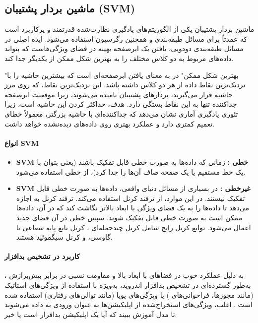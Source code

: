 \subsection{ماشین بردار پشتیبان (SVM)}
ماشین بردار پشتیبان  یکی از الگوریتم‌های یادگیری نظارت‌شده قدرتمند و پرکاربرد است که عمدتاً برای مسائل طبقه‌بندی  و همچنین رگرسیون  استفاده می‌شود. ایده اصلی  در مسائل طبقه‌بندی دودویی، یافتن یک ابرصفحه  بهینه در فضای ویژگی‌هاست که بتواند داده‌های مربوط به دو کلاس مختلف را به بهترین شکل ممکن از یکدیگر جدا کند.

"بهترین شکل ممکن" در  به معنای یافتن ابرصفحه‌ای است که بیشترین حاشیه  را با نزدیک‌ترین نقاط داده از هر دو کلاس داشته باشد. این نزدیک‌ترین نقاط، که روی مرز حاشیه قرار می‌گیرند، بردارهای پشتیبان  نامیده می‌شوند، زیرا موقعیت ابرصفحه جداکننده تنها به این نقاط بستگی دارد. هدف، حداکثر کردن این حاشیه است، زیرا تئوری یادگیری آماری نشان می‌دهد که جداکننده‌ای با حاشیه بزرگتر، معمولاً خطای تعمیم کمتری دارد و عملکرد بهتری روی داده‌های دیده‌نشده خواهد داشت.

\paragraph{انواع SVM}
\begin{itemize}
    \item \textbf{SVM خطی :} زمانی که داده‌ها به صورت خطی قابل تفکیک باشند (یعنی بتوان با یک خط مستقیم یا یک صفحه صاف آن‌ها را جدا کرد)، از  خطی استفاده می‌شود.
    \item \textbf{SVM غیرخطی :} در بسیاری از مسائل دنیای واقعی، داده‌ها به صورت خطی قابل تفکیک نیستند. در این موارد،  از ترفند کرنل  استفاده می‌کند. ترفند کرنل به  اجازه می‌دهد تا داده‌ها را به یک فضای ویژگی با ابعاد بالاتر نگاشت کند که در آن، داده‌ها ممکن است به صورت خطی قابل تفکیک شوند. سپس  خطی در آن فضای جدید اعمال می‌شود. توابع کرنل رایج شامل کرنل چندجمله‌ای ، کرنل تابع پایه شعاعی  یا گاوسی، و کرنل سیگموئید  هستند.
\end{itemize}

\paragraph{کاربرد در تشخیص بدافزار}
 به دلیل عملکرد خوب در فضاهای با ابعاد بالا و مقاومت نسبی در برابر بیش‌برازش ، به‌طور گسترده‌ای در تشخیص بدافزار اندروید، به‌ویژه با استفاده از ویژگی‌های استاتیک (مانند مجوزها، فراخوانی‌های ) یا ویژگی‌های پویا (مانند توالی‌های رفتاری) استفاده شده است \cite{AndroidMalwareSurvey, Demontis2017}. اغلب، ویژگی‌های استخراج‌شده از اپلیکیشن‌ها به عنوان ورودی به  داده می‌شوند تا مدل آموزش ببیند که آیا یک اپلیکیشن بدافزار است یا خیر.

